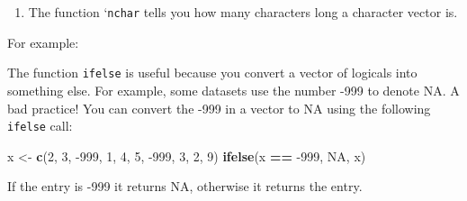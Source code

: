 \documentclass[]{article}
\newenvironment{Shaded}{\begin{snugshade}}{\end{snugshade}}
\newcommand{\CommentTok}[1]{\textcolor[rgb]{0.56,0.35,0.01}{\textit{#1}}}
\newcommand{\DecValTok}[1]{\textcolor[rgb]{0.00,0.00,0.81}{#1}}
\newcommand{\KeywordTok}[1]{\textcolor[rgb]{0.13,0.29,0.53}{\textbf{#1}}}
\newcommand{\NormalTok}[1]{#1}
\newcommand{\OperatorTok}[1]{\textcolor[rgb]{0.81,0.36,0.00}{\textbf{#1}}}
\newcommand{\OtherTok}[1]{\textcolor[rgb]{0.56,0.35,0.01}{#1}}
\newcommand{\StringTok}[1]{\textcolor[rgb]{0.31,0.60,0.02}{#1}}
\providecommand{\tightlist}{%
  \setlength{\itemsep}{0pt}\setlength{\parskip}{0pt}}
\begin{document}
\begin{enumerate}
\def\labelenumi{\arabic{enumi}.}
\setcounter{enumi}{2}
\tightlist
\item
  The function `\texttt{nchar} tells you how many characters long a
  character vector is.
\end{enumerate}

For example:

\begin{Shaded}
\end{Shaded}

The function \texttt{ifelse} is useful because you convert a vector of
logicals into something else. For example, some datasets use the number
-999 to denote NA. A bad practice! You can convert the -999 in a vector
to NA using the following \texttt{ifelse} call:

\begin{Shaded}
\begin{Highlighting}[]
\NormalTok{x <-}\StringTok{ }\KeywordTok{c}\NormalTok{(}\DecValTok{2}\NormalTok{, }\DecValTok{3}\NormalTok{, }\DecValTok{-999}\NormalTok{, }\DecValTok{1}\NormalTok{, }\DecValTok{4}\NormalTok{, }\DecValTok{5}\NormalTok{, }\DecValTok{-999}\NormalTok{, }\DecValTok{3}\NormalTok{, }\DecValTok{2}\NormalTok{, }\DecValTok{9}\NormalTok{)}
\KeywordTok{ifelse}\NormalTok{(x }\OperatorTok{==}\StringTok{ }\DecValTok{-999}\NormalTok{, }\OtherTok{NA}\NormalTok{, x)}
\end{Highlighting}
\end{Shaded}

If the entry is -999 it returns NA, otherwise it returns the entry.

\begin{Shaded}
\end{Shaded}
\end{document}
